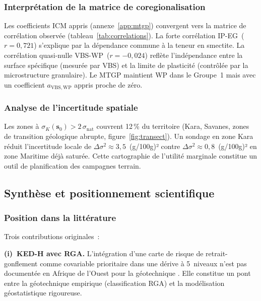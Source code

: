 \documentclass[10pt,a4paper,twocolumn]{article}
\newcommand{\bs}{\mathbf{s}}
\begin{document}
	\subsubsection{Interprétation de la matrice de coregionalisation}
	
	Les coefficients ICM appris (annexe~\ref{app:mtgp}) convergent
	vers la matrice de corrélation observée
	(tableau~\ref{tab:correlations}).
	La forte corrélation IP-EG~($r=0{,}721$) s'explique par la
	dépendance commune à la teneur en smectite.
	La corrélation quasi-nulle VBS-WP~($r=-0{,}024$) reflète
	l'indépendance entre la surface spécifique (mesurée par VBS)
	et la limite de plasticité (contrôlée par la microstructure
	granulaire). Le MTGP maintient WP dans le Groupe~1 mais avec
	un coefficient $a_{\mathrm{VBS,WP}}$ appris proche de zéro.
	
	\subsubsection{Analyse de l'incertitude spatiale}
	
	Les zones à $\sigma_K(\bs_0)>2\,\sigma_{\mathrm{nat}}$ couvrent
	12\,\% du territoire (Kara, Savanes, zones de transition géologique
	abrupte, figure~\ref{fig:transect}).
	Un sondage en zone Kara réduit l'incertitude locale de
	$\Delta\sigma^2\approx3{,}5$~(g/100g)² contre
	$\Delta\sigma^2\approx0{,}8$~(g/100g)² en zone Maritime
	déjà saturée. Cette cartographie de l'utilité marginale constitue
	un outil de planification des campagnes terrain.
	
	\subsection{Synthèse et positionnement scientifique}
	\label{subsec:synthese}
	
	\subsubsection{Position dans la littérature}
	
	Trois contributions originales~:
	
	\textbf{(i)~KED-H avec RGA.}
	L'intégration d'une carte de risque de retrait-gonflement comme
	covariable prioritaire dans une dérive à 5~niveaux n'est pas
	documentée en Afrique de l'Ouest pour la géotechnique
	\cite{odeh1994further}. Elle constitue un pont entre la
	géotechnique empirique (classification RGA) et la modélisation
	géostatistique rigoureuse.
	
\end{document}
